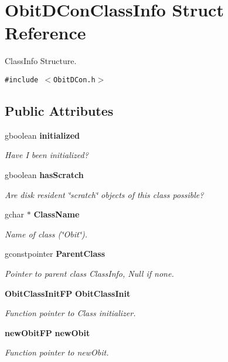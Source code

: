 \section{Obit\-DCon\-Class\-Info Struct Reference}
\label{structObitDConClassInfo}
Class\-Info Structure.  


{\tt \#include $<$Obit\-DCon.h$>$}

\subsection*{Public Attributes}
\begin{CompactItemize}
\item 
gboolean {\bf initialized}
\begin{CompactList}\small\item\em Have I been initialized? \item\end{CompactList}\item 
gboolean {\bf has\-Scratch}
\begin{CompactList}\small\item\em Are disk resident \char`\"{}scratch\char`\"{} objects of this class possible? \item\end{CompactList}\item 
gchar $\ast$ {\bf Class\-Name}
\begin{CompactList}\small\item\em Name of class (\char`\"{}Obit\char`\"{}). \item\end{CompactList}\item 
gconstpointer {\bf Parent\-Class}
\begin{CompactList}\small\item\em Pointer to parent class Class\-Info, Null if none. \item\end{CompactList}\item 
{\bf Obit\-Class\-Init\-FP} {\bf Obit\-Class\-Init}
\begin{CompactList}\small\item\em Function pointer to Class initializer. \item\end{CompactList}\item 
{\bf new\-Obit\-FP} {\bf new\-Obit}
\begin{CompactList}\small\item\em Function pointer to new\-Obit. \item\end{CompactList}\item 

\end{CompactItemize}
